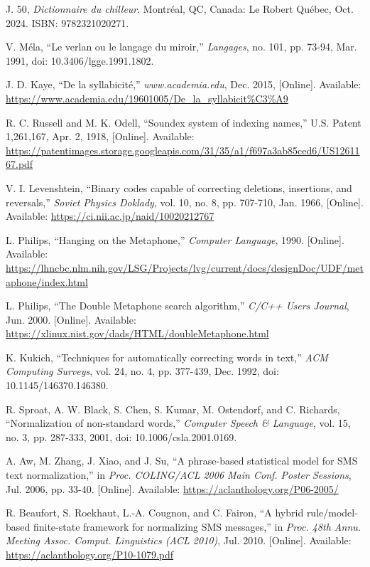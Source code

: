 \documentclass[12pt]{article}
\begin{document}
\begin{thebibliography}{99}
J. 50, \textit{Dictionnaire du chilleur}. Montréal, QC, Canada: Le Robert Québec, Oct. 2024. ISBN: 9782321020271.

V. Méla, ``Le verlan ou le langage du miroir,'' \textit{Langages}, no. 101, pp. 73-94, Mar. 1991, doi: 10.3406/lgge.1991.1802.

J. D. Kaye, ``De la syllabicité,'' \textit{www.academia.edu}, Dec. 2015, [Online]. Available: \url{https://www.academia.edu/19601005/De_la_syllabicit%C3%A9}

R. C. Russell and M. K. Odell, ``Soundex system of indexing names,'' U.S. Patent 1,261,167, Apr. 2, 1918, [Online]. Available: \url{https://patentimages.storage.googleapis.com/31/35/a1/f697a3ab85ced6/US1261167.pdf}

V. I. Levenshtein, ``Binary codes capable of correcting deletions, insertions, and reversals,'' \textit{Soviet Physics Doklady}, vol. 10, no. 8, pp. 707-710, Jan. 1966, [Online]. Available: \url{https://ci.nii.ac.jp/naid/10020212767}

L. Philips, ``Hanging on the Metaphone,'' \textit{Computer Language}, 1990. [Online]. Available: \url{https://lhncbc.nlm.nih.gov/LSG/Projects/lvg/current/docs/designDoc/UDF/metaphone/index.html}

L. Philips, ``The Double Metaphone search algorithm,'' \textit{C/C++ Users Journal}, Jun. 2000. [Online]. Available: \url{https://xlinux.nist.gov/dads/HTML/doubleMetaphone.html}

K. Kukich, ``Techniques for automatically correcting words in text,'' \textit{ACM Computing Surveys}, vol. 24, no. 4, pp. 377-439, Dec. 1992, doi: 10.1145/146370.146380.

R. Sproat, A. W. Black, S. Chen, S. Kumar, M. Ostendorf, and C. Richards, ``Normalization of non-standard words,'' \textit{Computer Speech \& Language}, vol. 15, no. 3, pp. 287-333, 2001, doi: 10.1006/csla.2001.0169.

A. Aw, M. Zhang, J. Xiao, and J. Su, ``A phrase-based statistical model for SMS text normalization,'' in \textit{Proc. COLING/ACL 2006 Main Conf. Poster Sessions}, Jul. 2006, pp. 33-40. [Online]. Available: \url{https://aclanthology.org/P06-2005/}

R. Beaufort, S. Roekhaut, L.-A. Cougnon, and C. Fairon, ``A hybrid rule/model-based finite-state framework for normalizing SMS messages,'' in \textit{Proc. 48th Annu. Meeting Assoc. Comput. Linguistics (ACL 2010)}, Jul. 2010. [Online]. Available: \url{https://aclanthology.org/P10-1079.pdf}


\end{thebibliography}
\end{document}
